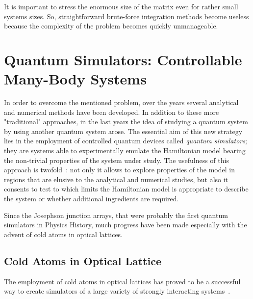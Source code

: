 It is important to stress the enormous size of the matrix even for rather small systems sizes. So, straightforward brute-force integration methods become useless because the complexity of the problem becomes quickly unmanageable.

\section{Quantum Simulators: Controllable Many-Body Systems}
In order to overcome the mentioned problem, over the years several analytical and numerical methods have been developed. In addition to these more "traditional" approaches, in the last years the idea of studying a quantum system by using another quantum system arose. The essential aim of this new strategy lies in the employment of controlled quantum devices called \emph{quantum simulators}; they are systems able to experimentally emulate the Hamiltonian model bearing the non-trivial properties of the system under study. The usefulness of this approach is twofold~\cite{Tomadin_Fazio}:  not only it allows to explore properties of the model in regions that are elusive to the analytical and numerical studies, but also it consents to test to which limits the Hamiltonian model is appropriate to describe the system or whether additional ingredients are required.

Since the Josephson junction arrays, that were probably the first quantum simulators in Physics History, much progress have been made especially with the advent of cold atoms in optical lattices.

\subsection{Cold Atoms in Optical Lattice}
The employment of cold atoms in optical lattices has proved to be a successful way to create simulators of a large variety of strongly interacting systems~\cite{ultracoldAtoms_condMatter}. 

